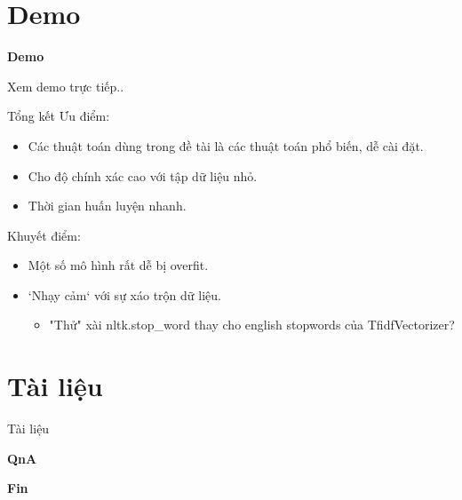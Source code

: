 \documentclass[aspectratio=169,xcolor=dvipsnames]{beamer}
\begin{document}
\section{Demo}
\begin{frame}
    \Huge{\centerline{\textbf{Demo}}}
    \centerline{Xem demo trực tiếp..}
\end{frame}

\begin{frame}{Tổng kết}
Ưu điểm:
\begin{itemize}
\item Các thuật toán dùng trong đề tài là các thuật toán phổ biến, dễ cài đặt.
\item Cho độ chính xác cao với tập dữ liệu nhỏ.
\item Thời gian huấn luyện nhanh.
\end{itemize}
Khuyết điểm:
\begin{itemize}
\item Một số mô hình rất dễ bị overfit.
\item `Nhạy cảm` với sự xáo trộn dữ liệu.\cite{Kowsari_2019}
\begin{itemize}
	\item "Thử" xài nltk.stop\_word thay cho english stopwords của TfidfVectorizer?
\end{itemize}
\end{itemize}
\end{frame}

\section{Tài liệu}

\begin{frame}{Tài liệu}
	\printbibliography
\end{frame}

\begin{frame}
    \Huge{\centerline{\textbf{QnA}}}
\end{frame}

\begin{frame}
    \Huge{\centerline{\textbf{Fin}}}
\end{frame}
\end{document}
